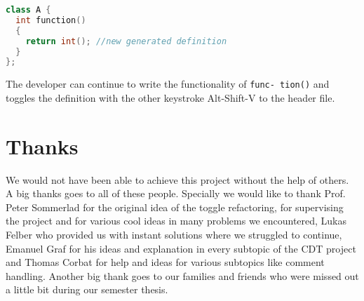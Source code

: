 \begin{lstlisting}[caption={Situation after quick implement},
label={beforeimpl}, language=C++]
class A {
  int function()
  {
    return int(); //new generated definition
  }
};
\end{lstlisting}

The developer can continue to write the functionality of \texttt{func- tion()}
and toggles the definition with the other keystroke Alt-Shift-V to the header
file.

\thispagestyle{empty}
\pagebreak

\chapter*{Thanks}
We would not have been able to achieve this project without the help of others.
A big thanks goes to all of these people.\newline
Specially we would like to thank Prof. Peter Sommerlad for the original idea
of the toggle refactoring, for supervising the project and for various cool
ideas in many problems we encountered, Lukas Felber who provided us with
instant solutions where we struggled to continue, Emanuel Graf for his ideas and
explanation in every subtopic of the CDT project and Thomas Corbat for help and
ideas for various subtopics like comment handling. \newline
Another big thank goes to our families and friends who were missed out a little
bit during our semester thesis.
\thispagestyle{empty}

